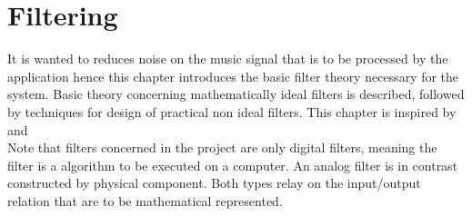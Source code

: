 \chapter{Filtering} \label{ch7}
It is wanted to reduces noise on the music signal that is to be processed by the application hence this chapter introduces the basic filter theory necessary for the system. Basic theory concerning mathematically ideal filters is described, followed by techniques for design of practical non ideal filters. This chapter is inspired by \cite{DTSP, ch. 5,7} and \cite{FSP, sec. 3.4.4}\\
Note that filters concerned in the project are only digital filters, meaning the filter is a algorithm to be executed on a computer. An analog filter is in contrast constructed by physical component. Both types relay on the input/output relation that are to be mathematical represented.     


